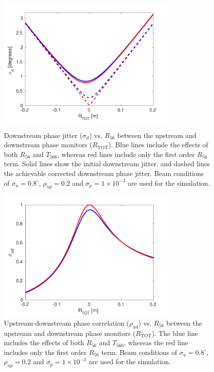 \begin{figure}
  \centering
  \includegraphics[width=0.8\textwidth]{Figures/propagation/jitVsR56_t566}
  \caption{Downstream phase jitter (\(\sigma_d\)) vs. \(R_{56}\) between the upstream and downstream phase monitors (\(R_{\mathrm{TOT}}\)). Blue lines include the effects of both \(R_{56}\) and \(T_{566}\), whereas red lines include only the first order \(R_{56}\) term. Solid lines show the initial downstream jitter, and dashed lines the achievable corrected downstream phase jitter. Beam conditions of \(\sigma_u = 0.8^\circ\), \(\rho_{up}=0.2\) and \(\sigma_p = 1 \times 10^{-3}\) are used for the simulation.}
  \label{f:jitVsR56_t566}
  \includegraphics[width=0.8\textwidth]{Figures/propagation/corrVsR56_t566}
  \caption{Upstream-downstream phase correlation (\(\rho_{ud}\)) vs. \(R_{56}\) between the upstream and downstream phase monitors (\(R_{\mathrm{TOT}}\)). The blue line includes the effects of both \(R_{56}\) and \(T_{566}\), whereas the red line includes only the first order \(R_{56}\) term.  Beam conditions of \(\sigma_u = 0.8^\circ\), \(\rho_{up}=0.2\) and \(\sigma_p = 1 \times 10^{-3}\) are used for the simulation.}
  \label{f:corrVsR56_t566}
\end{figure}

